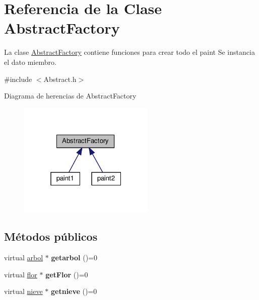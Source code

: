 \hypertarget{classAbstractFactory}{}\section{Referencia de la Clase Abstract\+Factory}
\label{classAbstractFactory}


La clase \hyperlink{classAbstractFactory}{Abstract\+Factory} contiene funciones para crear todo el paint  Se instancia el dato miembro.  




{\ttfamily \#include $<$Abstract.\+h$>$}



Diagrama de herencias de Abstract\+Factory
\nopagebreak
\begin{figure}[H]
\begin{center}
\leavevmode
\includegraphics[width=184pt]{classAbstractFactory__inherit__graph}
\end{center}
\end{figure}
\subsection*{Métodos públicos}
\begin{DoxyCompactItemize}
\item 
\mbox{\label{classAbstractFactory_a4a73c25633077f5c49681eb38cfaa42d}} 
virtual \hyperlink{classarbol}{arbol} $\ast$ {\bfseries getarbol} ()=0
\item 
\mbox{\label{classAbstractFactory_ac2e2c8c904de4282f1d49fe1231e441c}} 
virtual \hyperlink{classflor}{flor} $\ast$ {\bfseries get\+Flor} ()=0
\item 
\mbox{\label{classAbstractFactory_a37a36d0033a932766221222cd981b157}} 
virtual \hyperlink{classnieve}{nieve} $\ast$ {\bfseries getnieve} ()=0
\end{DoxyCompactItemize}


